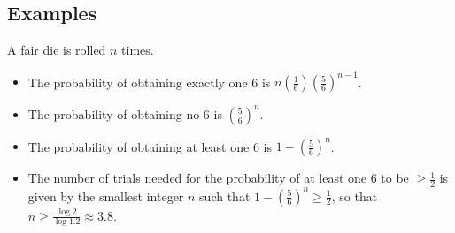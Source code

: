 \subsection{Examples}
\begin{example}
	A fair die is rolled $n$ times.
	\begin{itemize}
		\item The probability of obtaining exactly one 6 is $n\left(\frac{1}{6}\right)\left(\frac{5}{6}\right)^{n - 1}$.
		\item The probability of obtaining no 6 is $\left(\frac{5}{6}\right)^n$.
		\item The probability of obtaining at least one 6 is $1 - \left(\frac{5}{6}\right)^n$.
		\item The number of trials needed for the probability of at least one 6 to be $\geq \frac{1}{2}$ is given by the smallest integer $n$ such that $1 - \left(\frac{5}{6}\right)^n \geq \frac{1}{2}$, so that $n \geq \frac{\log 2}{\log 1.2} \approx 3.8$.
	\end{itemize}
\end{example}


